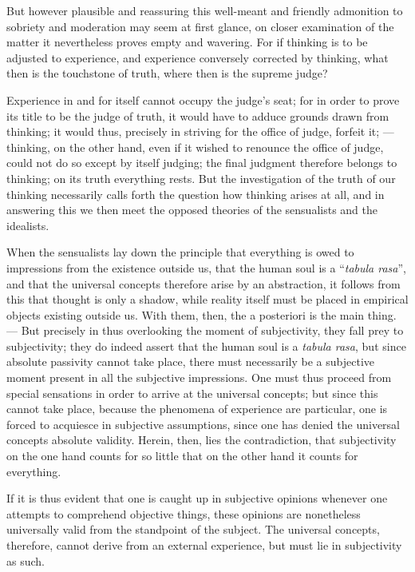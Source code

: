 \documentclass[12pt]{book}
\newcommand{\opage}[1]{\marginnote{\footnotesize\textit{[#1]}}}
\begin{document}
But however plausible and reassuring this well-meant and friendly admonition
to sobriety and moderation may seem at first glance, on closer examination of
the matter it nevertheless proves empty and wavering. For if
\opage{2} thinking is to be adjusted to experience, and experience conversely
corrected by thinking, what then is the touchstone of truth, where then is the
supreme judge?

Experience in and for itself cannot occupy the judge's seat; for in order to
prove its title to be the judge of truth, it would have to adduce grounds drawn
from thinking; it would thus, precisely in striving for the office of judge,
forfeit it; --- thinking, on the other hand, even if it wished to renounce the
office of judge, could not do so except by itself judging; the final judgment
therefore belongs to thinking; on its truth everything rests. But the
investigation of the truth of our thinking necessarily calls forth the
question how thinking arises at all, and in answering this we then meet the
opposed theories of the sensualists and the idealists.

When the sensualists lay down the principle that everything is owed to
impressions from the existence outside us, that the human soul is a
``\textit{tabula rasa}'', and that the universal concepts therefore arise by an
abstraction, it follows from this that thought is only a shadow, while reality
itself must be placed in empirical objects existing outside us. With them,
then, the a posteriori is the main thing. --- But precisely in thus overlooking
the moment of subjectivity, they fall prey to subjectivity; they do indeed
assert that the human soul is a \textit{tabula rasa}, but since absolute
passivity cannot take place, there must necessarily be a subjective moment
present in all the subjective impressions. One must thus proceed from special
sensations in order to arrive at the universal concepts; but since this cannot
take place, because the phenomena of experience are particular, one is forced
to acquiesce in subjective assumptions, since one has denied the universal
concepts absolute validity. Herein, then, lies the contradiction, that
\opage{3} subjectivity on the one hand counts for so little that on the other
hand it counts for everything.

If it is thus evident that one is caught up in subjective opinions whenever one
attempts to comprehend objective things, these opinions are nonetheless
universally valid from the standpoint of the subject. The universal concepts,
therefore, cannot derive from an external experience, but must lie in
subjectivity as such.
\end{document}
